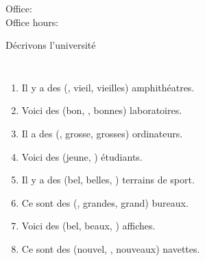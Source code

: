 \documentclass{beamer}
\subtitle[Adjectifs prénominaux au pluriel]{Les adjectifs prénominaux au pluriel}
\begin{document}
  \begin{frame}
    \titlepage
    \tiny{Office: \\
          Office hours: }
  \end{frame}

  \begin{frame}{Décrivons l'université}
    \begin{columns}
        {\scriptsize
        \begin{enumerate}
          \item Il y a des (, vieil, vieilles) amphithéatres.
          \item<3-> Voici des (bon, , bonnes) laboratoires.
          \item<5-> Il a des (, grosse, grosses) ordinateurs.
          \item<7-> Voici des (jeune, ) étudiants.
          \item<9-> Il y a des (bel, belles, ) terrains de sport.
          \item<11-> Ce sont des (, grandes, grand) bureaux.
          \item<13-> Voici des (bel, beaux, ) affiches.
          \item<15-> Ce sont des (nouvel, , nouveaux) navettes.
        \end{enumerate}
        }
        \begin{minipage}[c][0.6\textheight]{\linewidth}
          \begin{center}
          \end{center}
        \end{minipage}
    \end{columns}
  \end{frame}
\end{document}
